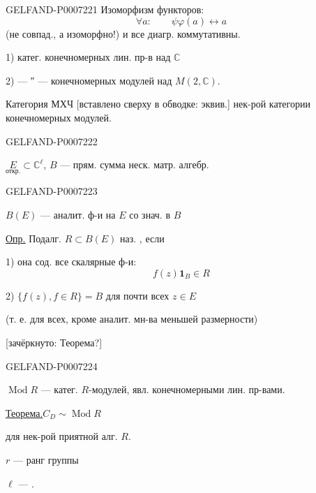 \begin{GelfandAdjacentEvidence}{GELFAND-P000722}{1}
Изоморфизм функторов:
\[
\forall a:\qquad\psi\varphi(a)\longleftrightarrow a
\]
(не совпад., а изоморфно!)
и все диагр. коммутативны.


1) катег. конечномерных лин. пр-в над \(\mathbb C\)

2) --- ″ --- конечномерных модулей над \(M(2,\mathbb C)\).

Категория МХЧ [вставлено сверху в обводке: эквив.] нек-рой категории конечномерных модулей.
\end{GelfandAdjacentEvidence}
\begin{GelfandAdjacentEvidence}{GELFAND-P000722}{2}


\(\underset{\text{откр.}}{E}\subset\mathbb C^\ell\), \qquad \(B\) --- прям. сумма неск. матр. алгебр.
\end{GelfandAdjacentEvidence}
\begin{GelfandAdjacentEvidence}{GELFAND-P000722}{3}


\(B(E)\) --- аналит. ф-и на \(E\) со знач. в \(B\)

\underline{\underline{Опр.}} Подалг. \(R\subset B(E)\) наз.
, если

1) она сод. все скалярные ф-и:
\[
f(z)\mathbf 1_B\in R
\]

2) \(\{f(z), f\in R\}=B\) для почти всех \(z\in E\)

(т. е. для всех, кроме аналит. мн-ва меньшей размерности)

[зачёркнуто: Теорема?]
\end{GelfandAdjacentEvidence}
\begin{GelfandAdjacentEvidence}{GELFAND-P000722}{4}

\(\operatorname{Mod} R\) --- катег. \(R\)-модулей, явл. конечномерными лин. пр-вами.

\underline{Теорема.}\qquad \(C_D\sim\operatorname{Mod} R\)

для нек-рой приятной алг. \(R\).

\(r\) --- ранг группы

\(\ell\) --- .
\end{GelfandAdjacentEvidence}
